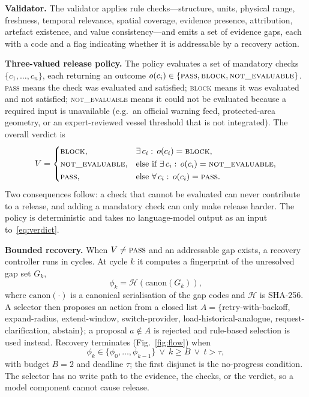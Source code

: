 \documentclass[conference]{IEEEtran}
\newcommand{\NE}{\textsc{not\_evaluable}}
\newcommand{\PASS}{\textsc{pass}}
\newcommand{\BLOCK}{\textsc{block}}
\begin{document}
\textbf{Validator.} The validator applies rule checks---structure, units, physical range, freshness, temporal relevance, spatial coverage, evidence presence, attribution, artefact existence, and value consistency---and emits a set of evidence gaps, each with a code and a flag indicating whether it is addressable by a recovery action.

\textbf{Three-valued release policy.} The policy evaluates a set of mandatory checks $\{c_1,\dots,c_n\}$, each returning an outcome $o(c_i)\in\{\PASS,\BLOCK,\NE\}$. \PASS{} means the check was evaluated and satisfied; \BLOCK{} means it was evaluated and not satisfied; \NE{} means it could not be evaluated because a required input is unavailable (e.g.\ an official warning feed, protected-area geometry, or an expert-reviewed vessel threshold that is not integrated). The overall verdict is
\begin{equation}
V=\begin{cases}
\BLOCK, & \exists\, c_i:\,o(c_i)=\BLOCK,\\[1pt]
\NE, & \text{else if } \exists\, c_i:\,o(c_i)=\NE,\\[1pt]
\PASS, & \text{else } \forall\, c_i:\,o(c_i)=\PASS.
\end{cases}
\label{eq:verdict}
\end{equation}
Two consequences follow: a check that cannot be evaluated can never contribute to a release, and adding a mandatory check can only make release harder. The policy is deterministic and takes no language-model output as an input to~\eqref{eq:verdict}.

\textbf{Bounded recovery.} When $V\neq\PASS$ and an addressable gap exists, a recovery controller runs in cycles. At cycle $k$ it computes a fingerprint of the unresolved gap set $G_k$,
\begin{equation}
\phi_k=\mathcal{H}\!\left(\mathrm{canon}(G_k)\right),
\label{eq:fp}
\end{equation}
where $\mathrm{canon}(\cdot)$ is a canonical serialisation of the gap codes and $\mathcal{H}$ is SHA-256. A selector then proposes an action from a closed list $A=\{$retry-with-backoff, expand-radius, extend-window, switch-provider, load-historical-analogue, request-clarification, abstain$\}$; a proposal $a\notin A$ is rejected and rule-based selection is used instead. Recovery terminates (Fig.~\ref{fig:flow}) when
\begin{equation}
\phi_k\in\{\phi_0,\dots,\phi_{k-1}\}\ \lor\ k\ge B\ \lor\ t>\tau,
\label{eq:stop}
\end{equation}
with budget $B{=}2$ and deadline $\tau$; the first disjunct is the no-progress condition. The selector has no write path to the evidence, the checks, or the verdict, so a model component cannot cause release.
\end{document}
